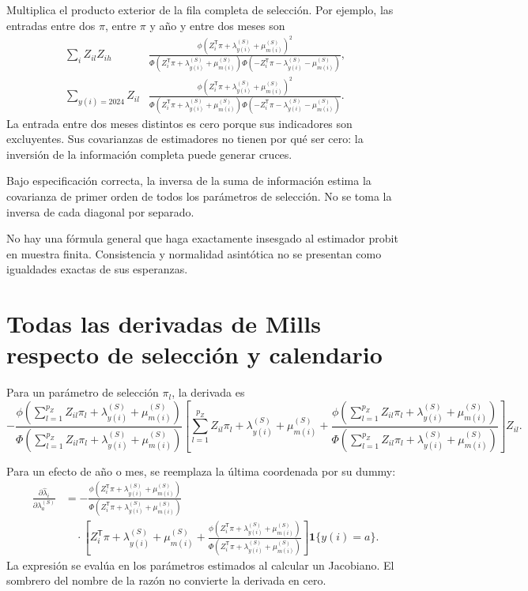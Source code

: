 \documentclass[11pt,a4paper]{article}
\begin{document}
Multiplica el producto exterior de la fila completa de selección. Por ejemplo, las entradas entre dos $\pi$, entre $\pi$ y año y entre dos meses son
\[
\begin{aligned}
\sum_iZ_{il}Z_{ih}
&\frac{\phi(Z_i^{\mathsf T}\pi+\lambda_{y(i)}^{(S)}+\mu_{m(i)}^{(S)})^2}
{\Phi(Z_i^{\mathsf T}\pi+\lambda_{y(i)}^{(S)}+\mu_{m(i)}^{(S)})
\Phi(-Z_i^{\mathsf T}\pi-\lambda_{y(i)}^{(S)}-\mu_{m(i)}^{(S)})},\\
\sum_{y(i)=2024}Z_{il}
&\frac{\phi(Z_i^{\mathsf T}\pi+\lambda_{y(i)}^{(S)}+\mu_{m(i)}^{(S)})^2}
{\Phi(Z_i^{\mathsf T}\pi+\lambda_{y(i)}^{(S)}+\mu_{m(i)}^{(S)})
\Phi(-Z_i^{\mathsf T}\pi-\lambda_{y(i)}^{(S)}-\mu_{m(i)}^{(S)})}.
\end{aligned}
\]
La entrada entre dos meses distintos es cero porque sus indicadores son excluyentes. Sus covarianzas de estimadores no tienen por qué ser cero: la inversión de la información completa puede generar cruces.

Bajo especificación correcta, la inversa de la suma de información estima la covarianza de primer orden de todos los parámetros de selección. No se toma la inversa de cada diagonal por separado.

No hay una fórmula general que haga exactamente insesgado al estimador probit en muestra finita. Consistencia y normalidad asintótica no se presentan como igualdades exactas de sus esperanzas.

\clearpage
\section{Todas las derivadas de Mills respecto de selección y calendario}
Para un parámetro de selección $\pi_l$, la derivada es
\[
-\frac{\phi\!\left(\sum_{l=1}^{p_Z}Z_{il}\pi_l+\lambda_{y(i)}^{(S)}+\mu_{m(i)}^{(S)}\right)}{\Phi\!\left(\sum_{l=1}^{p_Z}Z_{il}\pi_l+\lambda_{y(i)}^{(S)}+\mu_{m(i)}^{(S)}\right)}\left[\sum_{l=1}^{p_Z}Z_{il}\pi_l+\lambda_{y(i)}^{(S)}+\mu_{m(i)}^{(S)}+\frac{\phi\!\left(\sum_{l=1}^{p_Z}Z_{il}\pi_l+\lambda_{y(i)}^{(S)}+\mu_{m(i)}^{(S)}\right)}{\Phi\!\left(\sum_{l=1}^{p_Z}Z_{il}\pi_l+\lambda_{y(i)}^{(S)}+\mu_{m(i)}^{(S)}\right)}\right]Z_{il}.
\]

Para un efecto de año o mes, se reemplaza la última coordenada por su dummy:
\[
\begin{aligned}
\frac{\partial\widehat\lambda_i}{\partial\lambda_a^{(S)}}
&=-\frac{\phi(Z_i^{\mathsf T}\pi+\lambda_{y(i)}^{(S)}+\mu_{m(i)}^{(S)})}
{\Phi(Z_i^{\mathsf T}\pi+\lambda_{y(i)}^{(S)}+\mu_{m(i)}^{(S)})}\\
&\quad\cdot\left[Z_i^{\mathsf T}\pi+\lambda_{y(i)}^{(S)}+\mu_{m(i)}^{(S)}
+\frac{\phi(Z_i^{\mathsf T}\pi+\lambda_{y(i)}^{(S)}+\mu_{m(i)}^{(S)})}
{\Phi(Z_i^{\mathsf T}\pi+\lambda_{y(i)}^{(S)}+\mu_{m(i)}^{(S)})}\right]\mathbf1\{y(i)=a\}.
\end{aligned}
\]
La expresión se evalúa en los parámetros estimados al calcular un Jacobiano. El sombrero del nombre de la razón no convierte la derivada en cero.
\end{document}
